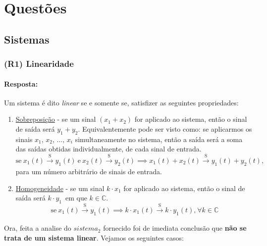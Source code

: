 \clearpage
\section{Questões}
\label{sec:questoes}
\subsection{\bf{Sistemas}}
\label{subsec:sistemas}
\subsubsection{(R1) Linearidade}
\label{subsubsec:R1}
\paragraph{Resposta:} %
Um sistema é dito \textit{linear} se e somente se, satisfizer as seguintes propriedades:
\begin{enumerate}
    \label{propriedade:1}
    \item \underline{Sobreposição} - se um sinal \((x_1 + x_2)\) for aplicado ao sistema, então o sinal de saída será \(y_1 + y_2\). Equivalentemente pode ser visto como: se aplicarmos os sinais \(x_1\), \(x_2\), ..., \(x_i\) simultaneamente no sistema, então a saída será a soma das saídas obtidas individualmente, de cada sinal de entrada.
        \[ \text{se}\ x_1(t) \xrightarrow[]{\text{S}} y_1(t)\ \text{e}\ x_2(t) \xrightarrow[]{\text{S}} y_2(t) \implies x_1(t) + x_2(t) \xrightarrow[]{\text{S}} y_1(t) + y_2(t) \text{,} \]
        para um número arbitrário de sinais de entrada.
    \label{propriedade:2}
    \item \underline{Homogeneidade} - se um sinal \(k \cdot x_1\) for aplicado ao sistema, então o sinal de saída será \(k \cdot y_1\)\ em que \(k \in \mathbb{C}\).
        \[ \text{se}\ x_1(t) \xrightarrow[]{\text{S}} y_1(t) \implies k \cdot x_1(t) \xrightarrow[]{\text{S}} k \cdot y_1(t) \text{,}\ \forall k \in \mathbb{C} \]
\end{enumerate}

Ora, feita a analise do \(sistema_2\) fornecido foi de imediata conclusão que \textbf{não se trata de um sistema linear}. Vejamos os seguintes casos:

